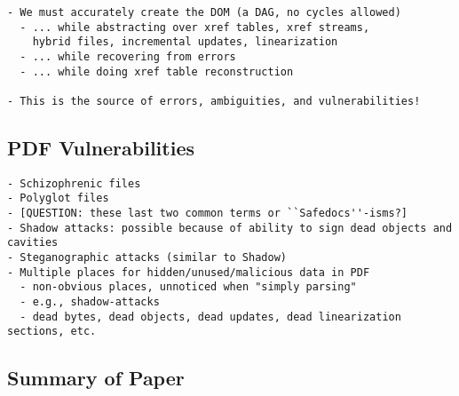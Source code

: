 \begin{lstlisting}[style=meta]
- We must accurately create the DOM (a DAG, no cycles allowed)
  - ... while abstracting over xref tables, xref streams,
    hybrid files, incremental updates, linearization
  - ... while recovering from errors
  - ... while doing xref table reconstruction

- This is the source of errors, ambiguities, and vulnerabilities!
\end{lstlisting}

\subsection{PDF Vulnerabilities}
\label{sec:pdf-vulnerabilities}

\begin{lstlisting}[style=meta]
- Schizophrenic files
- Polyglot files
- [QUESTION: these last two common terms or ``Safedocs''-isms?]
- Shadow attacks: possible because of ability to sign dead objects and cavities
- Steganographic attacks (similar to Shadow)
- Multiple places for hidden/unused/malicious data in PDF
  - non-obvious places, unnoticed when "simply parsing"
  - e.g., shadow-attacks
  - dead bytes, dead objects, dead updates, dead linearization sections, etc.
\end{lstlisting}


\subsection{Summary of Paper}

